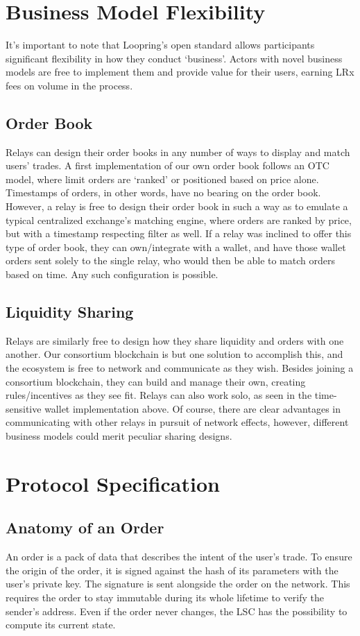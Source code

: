 \documentclass[UTF8,nofonts]{article}
\begin{document}
\section{Business Model Flexibility}
It’s important to note that Loopring’s open standard allows participants significant flexibility in how they conduct ‘business’. Actors with novel business models are free to implement them and provide value for their users, earning LRx fees on volume in the process.
\subsection{Order Book}
Relays can design their order books in any number of ways to display and match users’ trades. A first implementation of our own order book follows an OTC model, where limit orders are ‘ranked’ or positioned based on price alone. Timestamps of orders, in other words, have no bearing on the order book. However, a relay is free to design their order book in such a way as to emulate a typical centralized exchange’s matching engine, where orders are ranked by price, but with a timestamp respecting filter as well. If a relay was inclined to offer this type of order book, they can own/integrate with a wallet, and have those wallet orders sent solely to the single relay, who would then be able to match orders based on time. Any such configuration is possible. 

\subsection{Liquidity Sharing}
Relays are similarly free to design how they share liquidity and orders with one another. Our consortium blockchain is but one solution to accomplish this, and the ecosystem is free to network and communicate as they wish. Besides joining a consortium blockchain, they can build and manage their own, creating rules/incentives as they see fit. Relays can also work solo, as seen in the time-sensitive wallet implementation above. Of course, there are clear advantages in communicating with other relays in pursuit of network effects, however, different business models could merit peculiar sharing designs. 



\section{Protocol Specification}

\subsection{Anatomy of an Order}
An order is a pack of data that describes the intent of the user’s trade. To ensure the origin of the order, it is signed against the hash of its parameters with the user's private key. The signature is sent alongside the order on the network. This requires the order to stay immutable during its whole lifetime to verify the sender's address. Even if the order never changes, the LSC has the possibility to compute its current state.
\end{document}
